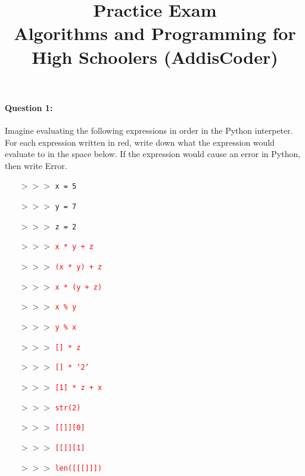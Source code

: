 \documentclass[11pt]{article}
\newcommand{\ans}[1]{\textcolor{red}{#1}}
\begin{document}
\title{Practice Exam\\Algorithms and Programming for High Schoolers
  (AddisCoder)}
\date{}

\maketitle

\paragraph{Question 1:}
Imagine evaluating the following expressions in order in the Python
interpeter.  For each expression written in red, write down what the
expression would evaluate to in the space below.  If the expression
would cause an error in Python, then write Error.

\begin{itemize}
\item[$>>>$]\texttt{x = 5}
\item[$>>>$]\texttt{y = 7}
\item[$>>>$]\texttt{z = 2}
\item[$>>>$]\ans{\texttt{x * y + z}}
\item[]
\item[$>>>$]\ans{\texttt{(x * y) + z}}
\item[]
\item[$>>>$]\ans{\texttt{x * (y + z)}}
\item[]
\item[$>>>$]\ans{\texttt{x \% y}}
\item[]
\item[$>>>$]\ans{\texttt{y \% x}}
\item[]
\item[$>>>$]\ans{\texttt{[] * z}}
\item[]
\item[$>>>$]\ans{\texttt{[] * `2'}}
\item[]
\item[$>>>$]\ans{\texttt{[1] * z + x}}
\item[]
\item[$>>>$]\ans{\texttt{str(2)}}
\item[]
\item[$>>>$]\ans{\texttt{[[]][0]}}
\item[]
\item[$>>>$]\ans{\texttt{[[]][1]}}
\item[]
\item[$>>>$]\ans{\texttt{len([[[]]])}}
\item[]

\end{itemize}
\end{document}
